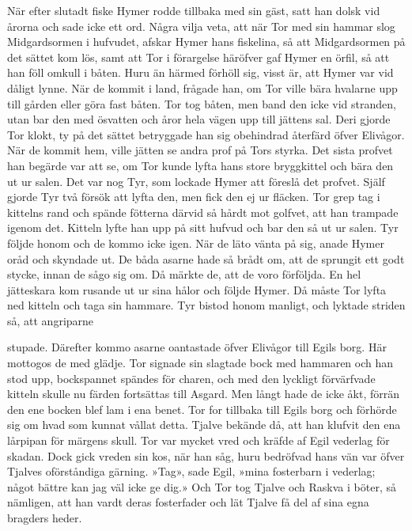 När efter slutadt fiske Hymer rodde tillbaka med sin gäst, satt han
dolsk vid årorna och sade icke ett ord. Några vilja veta, att när Tor
med sin hammar slog Midgardsormen i hufvudet, afskar Hymer hans
fiskelina, så att Midgardsormen på det sättet kom lös, samt att Tor i
förargelse häröfver gaf Hymer en örfil, så att han föll omkull i båten.
Huru än härmed förhöll sig, visst är, att Hymer var vid dåligt lynne.
När de kommit i land, frågade han, om Tor ville bära hvalarne upp till
gården eller göra fast båten. Tor tog båten, men band den icke vid
stranden, utan bar den med ösvatten och åror hela vägen upp till jättens
sal. Deri gjorde Tor klokt, ty på det sättet betryggade han sig
obehindrad återfärd öfver Elivågor. När de kommit hem, ville jätten se
andra prof på Tors styrka. Det sista profvet han begärde var att se, om
Tor kunde lyfta hans store bryggkittel och bära den ut ur salen. Det var
nog Tyr, som lockade Hymer att föreslå det profvet. Själf gjorde Tyr två
försök att lyfta den, men fick den ej ur fläcken. Tor grep tag i
kittelns rand och spände fötterna därvid så hårdt mot golfvet, att han
trampade igenom det. Kitteln lyfte han upp på sitt hufvud och bar den så
ut ur salen. Tyr följde honom och de kommo icke igen. När de läto vänta
på sig, anade Hymer oråd och skyndade ut. De båda asarne hade så brådt
om, att de sprungit ett godt stycke, innan de sågo sig om. Då märkte de,
att de voro förföljda. En hel jätteskara kom rusande ut ur sina hålor
och följde Hymer. Då måste Tor lyfta ned kitteln och taga sin hammare.
Tyr bistod honom manligt, och lyktade striden så, att angriparne

stupade. Därefter kommo asarne oantastade öfver Elivågor till Egils
borg. Här mottogos de med glädje. Tor signade sin slagtade bock med
hammaren och han stod upp, bockspannet spändes för charen, och med den
lyckligt förvärfvade kitteln skulle nu färden fortsättas till Asgard.
Men långt hade de icke åkt, förrän den ene bocken blef lam i ena benet.
Tor for tillbaka till Egils borg och förhörde sig om hvad som kunnat
vållat detta. Tjalve bekände då, att han klufvit den ena lårpipan för
märgens skull. Tor var mycket vred och kräfde af Egil vederlag för
skadan. Dock gick vreden sin kos, när han såg, huru bedröfvad hans vän
var öfver Tjalves oförståndiga gärning. »Tag», sade Egil, »mina
fosterbarn i vederlag; något bättre kan jag väl icke ge dig.» Och Tor
tog Tjalve och Raskva i böter, så nämligen, att han vardt deras
fosterfader och lät Tjalve få del af sina egna bragders heder.



